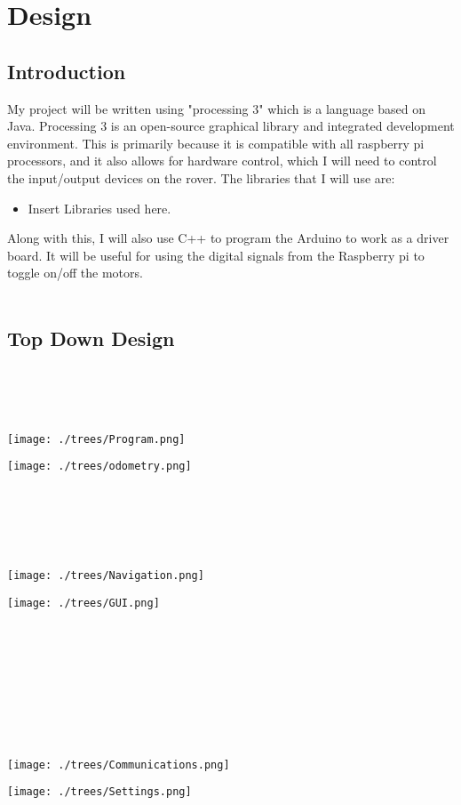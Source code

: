 \documentclass[11pt]{report}
\begin{document}
\chapter{Design}

\section{Introduction}

My project will be written using "processing 3" which is a language based on Java. Processing 3 is an open-source graphical library and integrated development environment. This is primarily because it is compatible with all raspberry pi processors, and it also allows for hardware control, which I will need to control the input/output devices on the rover. The libraries that I will use are:
\begin{itemize}
	\item{Insert Libraries used here.}
\end{itemize}  
\noindent
Along with this, I will also use C++ to program the Arduino to work as a driver board. It will be useful for using the digital signals from the Raspberry pi to toggle on/off the motors.
\\\\

\section{Top Down Design}
\noindent
\\\\\\
\centerline{\texttt{[image: ./trees/Program.png]}}
\centerline{\texttt{[image: ./trees/odometry.png]}}
\\\\\\\\
\centerline{\texttt{[image: ./trees/Navigation.png]}}
\centerline{\texttt{[image: ./trees/GUI.png]}}
\\\\\\\\\\\\\\
\centerline{\texttt{[image: ./trees/Communications.png]}}
\centerline{\texttt{[image: ./trees/Settings.png]}}
\\\\\\
\end{document}
